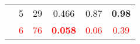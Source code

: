 \begin{table}
\begin{tabular}{rrrrrr}
    \multicolumn{1}{c}{} & \multicolumn{1}{c}{5} & \multicolumn{1}{c}{29} & \multicolumn{1}{c}{0.466 } & \multicolumn{1}{c}{0.87 } & \multicolumn{1}{c}{\textbf{0.98}} \\
    \multicolumn{1}{c}{} & \multicolumn{1}{c}{\textcolor{red}{6}} & \multicolumn{1}{c}{\textcolor{red}{76}} & \multicolumn{1}{c}{\textcolor{red}{\textbf{0.058}}} & \multicolumn{1}{c}{\textcolor{red}{0.06}} & \multicolumn{1}{c}{\textcolor{red}{0.39}} \\
    \bottomrule
    \end{tabular}%
  \label{tab:ANCTVPHPA}%
\end{table}%
